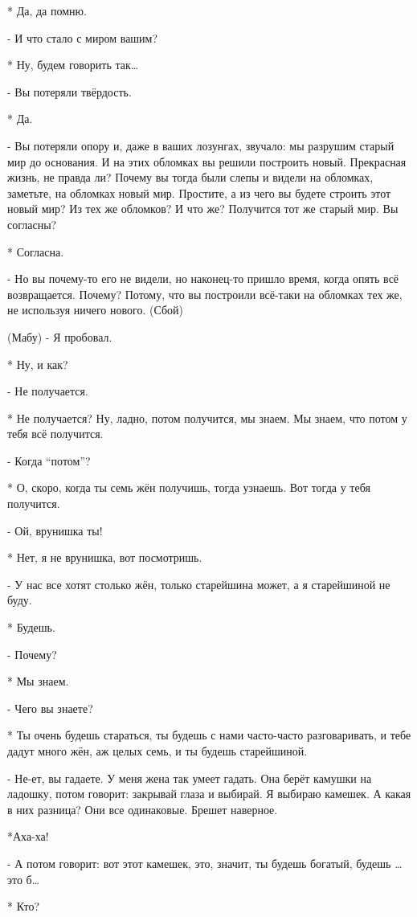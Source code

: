 * Да, да помню.

- И что стало с миром вашим? 

* Ну, будем говорить так…

- Вы потеряли твёрдость.

* Да.

- Вы потеряли опору и, даже в ваших лозунгах, звучало: мы разрушим старый мир до основания. И на этих обломках  вы решили построить новый. Прекрасная жизнь, не правда ли? Почему вы тогда были слепы и видели на обломках, заметьте, на обломках новый мир. Простите, а из чего вы будете строить этот новый мир? Из тех же обломков? И что же? Получится тот же старый мир. Вы согласны?

* Согласна.

- Но вы почему-то его не видели, но наконец-то пришло время, когда опять всё возвращается. Почему? Потому, что вы построили всё-таки на обломках тех же, не используя ничего нового. (Сбой)

(Мабу)
- Я пробовал.

* Ну, и  как?

- Не получается.

* Не получается? Ну, ладно, потом получится, мы знаем. Мы знаем, что потом у тебя всё получится.

- Когда “потом”?

* О, скоро, когда ты семь жён получишь, тогда узнаешь. Вот тогда у тебя получится.

- Ой, врунишка ты!

* Нет, я не врунишка, вот посмотришь.

- У нас все хотят столько жён, только старейшина может, а я старейшиной не буду.

* Будешь.

- Почему?

* Мы знаем.

- Чего вы знаете?

* Ты очень будешь стараться, ты будешь с нами часто-часто разговаривать, и тебе дадут много жён, аж целых семь, и ты будешь старейшиной.

- Не-ет, вы гадаете. У меня жена так умеет гадать. Она берёт камушки на ладошку, потом говорит: закрывай глаза и выбирай. Я выбираю камешек. А какая в них разница? Они все одинаковые. Брешет наверное.

*Аха-ха!

 - А потом говорит: вот этот камешек, это, значит, ты будешь богатый, будешь … это б…

* Кто?

